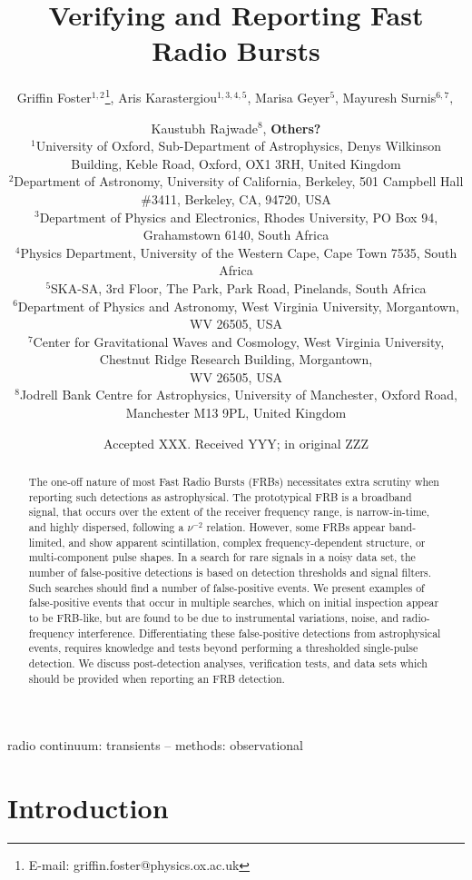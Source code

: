 \documentclass[a4paper,fleqn,usenatbib]{mnras}
\title[FRB Verification]{Verifying and Reporting Fast Radio Bursts}
\author[G. Foster et al.]{
Griffin Foster$^{1,2}$\thanks{E-mail: griffin.foster@physics.ox.ac.uk},
Aris Karastergiou$^{1,3,4,5}$,
Marisa Geyer$^{5}$,
Mayuresh Surnis$^{6,7},$
\and
Kaustubh Rajwade$^{8}$, 
\textbf{Others?}
\\
$^{1}$University of Oxford, Sub-Department of Astrophysics, Denys Wilkinson Building, Keble Road, Oxford, OX1 3RH, United Kingdom\\
$^{2}$Department of Astronomy, University of California, Berkeley, 501 Campbell
Hall \#3411, Berkeley, CA, 94720, USA\\
$^{3}$Department of Physics and Electronics, Rhodes University,
    PO Box 94, Grahamstown 6140, South Africa\\
$^{4}$Physics Department, University of the Western Cape,
    Cape Town 7535, South Africa\\
$^{5}$SKA-SA, 3rd Floor, The Park, Park Road, Pinelands, South Africa\\
$^{6}$Department of Physics and Astronomy, West Virginia University, Morgantown, WV 26505, USA\\
$^{7}$Center for Gravitational Waves and Cosmology, West Virginia University, Chestnut Ridge Research Building, Morgantown,\\ WV 26505, USA\\
$^{8}$Jodrell Bank Centre for Astrophysics, University of Manchester, Oxford Road, Manchester M13 9PL, United Kingdom\\
}
\date{Accepted XXX. Received YYY; in original ZZZ}
\begin{document}
\label{firstpage}
\pagerange{\pageref{firstpage}--\pageref{lastpage}}
\maketitle

\begin{abstract}
The one-off nature of most Fast Radio Bursts (FRBs) necessitates extra scrutiny
when reporting such detections as astrophysical.  The prototypical FRB is a
broadband signal, that occurs over the extent of the receiver frequency range,
is narrow-in-time, and highly dispersed, following a $\nu^{-2}$ relation.
However, some FRBs appear band-limited, and show apparent scintillation, complex
frequency-dependent structure, or multi-component pulse shapes.  In a search for
rare signals in a noisy data set, the number of false-positive detections is
based on detection thresholds and signal filters.  Such searches should find a
number of false-positive events.  We present examples of false-positive events
that occur in multiple searches, which on initial inspection appear to be
FRB-like, but are found to be due to instrumental variations, noise, and
radio-frequency interference.  Differentiating these false-positive detections
from astrophysical events, requires knowledge and tests beyond performing a
thresholded single-pulse detection.  We discuss post-detection analyses,
verification tests, and data sets which should be provided when reporting an FRB
detection.
\end{abstract}

\begin{keywords}
radio continuum: transients -- methods: observational
\end{keywords}


\section{Introduction}
\label{sec:intro}
\end{document}
